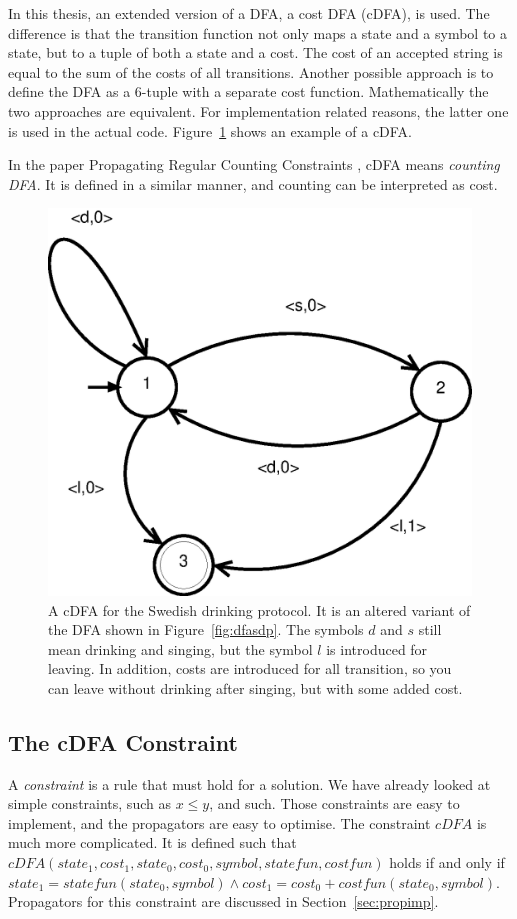 \documentclass[a4paper,11pt]{article}
\begin{document}
In this thesis, an extended version of a DFA, a cost DFA (cDFA), is used. The difference is that the transition function not only maps a state and a symbol to a state, but to a tuple of both a state and a cost. The cost of an accepted string is equal to the sum of the costs of all transitions. Another possible approach is to define the DFA as a 6-tuple with a separate cost function. Mathematically the two approaches are equivalent. For implementation related reasons, the latter one is used in the actual code. Figure~\ref{fig:cdfasdp} shows an example of a cDFA.

In the paper Propagating Regular Counting Constraints \cite{Beldiceanu675954}, cDFA means \textit{counting DFA}. It is defined in a similar manner, and counting can be interpreted as cost. 

\begin{figure}[H]
\centering
\includegraphics[scale=0.6]{cdfa.eps}
\caption{A cDFA for the Swedish drinking protocol. It is an altered variant of the DFA shown in Figure~\ref{fig:dfasdp}. The symbols $d$ and $s$ still mean drinking and singing, but the symbol $l$ is introduced for leaving. In addition, costs are introduced for all transition, so you can leave without drinking after singing, but with some added cost.}
\label{fig:cdfasdp}
\end{figure}

\subsection{The cDFA Constraint}
\label{sec:cdfaconstraint}
A \textit{constraint} is a rule that must hold for a solution. We have already looked at simple constraints, such as $x\le y$, and such. Those constraints are easy to implement, and the propagators are easy to optimise. The constraint $cDFA$ is much more complicated. It is defined such that $cDFA(state_1, cost_1, state_0, cost_0, symbol, statefun, costfun)$ holds if and only if $state_1= statefun(state_0, symbol) \land cost_1=cost_0+costfun(state_0, symbol)$. Propagators for this constraint are discussed in Section~\ref{sec:propimp}.
\end{document}
